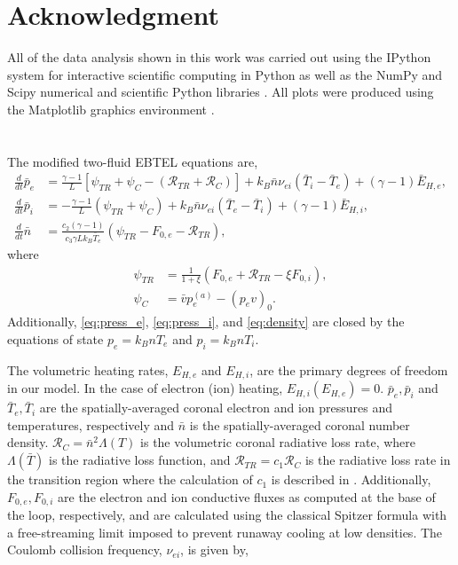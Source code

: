 \documentclass[apj]{emulateapj}
\begin{document}
	\section*{Acknowledgment}
	All of the data analysis shown in this work was carried out using the IPython system for interactive scientific computing in Python as well as the NumPy and Scipy numerical and scientific Python libraries \citep{perez_ipython:_2007,van_der_walt_numpy_2011}. All plots were produced using the Matplotlib graphics environment \citep{hunter_matplotlib:_2007}.
	\appendix
	\section{}
	\label{appendix}
	The modified two-fluid EBTEL equations are,
		\begin{align}
			\frac{d}{dt}\bar{p}_e &= \frac{\gamma - 1}{L}[\psi_{TR} + \psi_C -(\mathcal{R}_{TR} + \mathcal{R}_C)] + k_B\bar{n}\nu_{ei}(\bar{T}_i-\bar{T}_e) + (\gamma-1)\bar{E}_{H,e},\label{eq:press_e} \\[0.5em]
			\frac{d}{dt}\bar{p}_i &= -\frac{\gamma - 1}{L}(\psi_{TR} + \psi_C) + k_B\bar{n}\nu_{ei}(\bar{T}_e-\bar{T}_i) + (\gamma-1)\bar{E}_{H,i},\label{eq:press_i} \\[0.5em]
			\frac{d}{dt}\bar{n} &= \frac{c_2(\gamma-1)}{c_3\gamma Lk_B\bar{T}_e}(\psi_{TR} - F_{0,e}-\mathcal{R}_{TR}), 	\label{eq:density}
		\end{align}
		where 
		\begin{align}
			\psi_{TR} &= \frac{1}{1 + \xi}(F_{0,e} + \mathcal{R}_{TR} - \xi F_{0,i}), \label{eq:psi_tr}\\[0.5em]
			\psi_C  &= \bar{v}p_e^{(a)} - (p_ev)_0. \label{eq:psi_C}
		\end{align}
		Additionally, \autoref{eq:press_e}, \autoref{eq:press_i}, and \autoref{eq:density} are closed by the equations of state $p_e=k_BnT_e$ and $p_i=k_BnT_i$. 
		\par The volumetric heating rates, $E_{H,e}$ and $E_{H,i}$, are the primary degrees of freedom in our model. In the case of electron (ion) heating, $E_{H,i}(E_{H,e})=0$. $\bar{p}_e,\bar{p}_i$ and $\bar{T}_e,\bar{T}_i$ are the spatially-averaged coronal electron and ion pressures and temperatures, respectively and $\bar{n}$ is the spatially-averaged coronal number density. $\mathcal{R}_C=\bar{n}^2\Lambda(T)$ is the volumetric coronal radiative loss rate, where $\Lambda(\bar{T})$ is the radiative loss function, and $\mathcal{R}_{TR}=c_1\mathcal{R}_C$ is the radiative loss rate in the transition region where the calculation of $c_1$ is described in \citet{cargill_enthalpy-based_2012}. Additionally, $F_{0,e},F_{0,i}$ are the electron and ion conductive fluxes as computed at the base of the loop, respectively, and are calculated using the classical Spitzer formula with a free-streaming limit imposed to prevent runaway cooling at low densities. The Coulomb collision frequency, $\nu_{ei}$, is given by,
\end{document}
